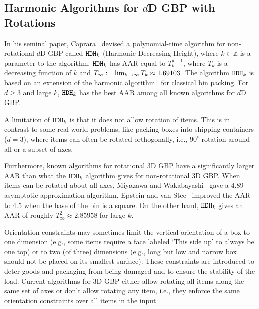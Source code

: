 \subsection{Harmonic Algorithms for \texorpdfstring{$d$}{d}D GBP with Rotations}

In his seminal paper, Caprara~\cite{caprara2008} devised a polynomial-time algorithm
for non-rotational $d$D GBP called $\operatorname{\mathtt{HDH}}_{k}$ (Harmonic Decreasing Height),
where $k \in \mathbb{Z}$ is a parameter to the algorithm.
$\operatorname{\mathtt{HDH}}_{k}$ has AAR equal to $T_k^{d-1}$,
where $T_k$ is a decreasing function of $k$ and
$T_{\infty} := \lim_{k \to \infty} T_k \approx 1.69103$.
The algorithm $\operatorname{\mathtt{HDH}}_{k}$ is based on an extension of the harmonic algorithm~\cite{leelee}
for classical bin packing.
For $d \ge 3$ and large $k$, $\operatorname{\mathtt{HDH}}_{k}$ has the best AAR
among all known algorithms for $d$D GBP.

A limitation of $\operatorname{\mathtt{HDH}}_{k}$ is that it does not allow rotation of items.
This is in contrast to some real-world problems,
like packing boxes into shipping containers ($d=3$),
where items can often be rotated orthogonally,
i.e., $90^{\circ}$ rotation around all or a subset of axes.

Furthermore, known algorithms for rotational 3D GBP have a significantly larger AAR
than what the $\operatorname{\mathtt{HDH}}_{k}$ algorithm gives for non-rotational 3D GBP.
When items can be rotated about all axes,
Miyazawa and Wakabayashi~\cite{miyazawa2009three} gave a
4.89-asymptotic-approximation algorithm.
Epstein and van Stee~\cite{epstein2006side} improved the AAR to
4.5 when the base of the bin is a square.
On the other hand, $\operatorname{\mathtt{HDH}}_{k}$ gives an AAR of roughly
$T_{\infty}^2 \approx 2.85958$ for large $k$.

Orientation constraints may sometimes limit the vertical orientation of a box to one dimension
(e.g., some items require a face labeled `This side up' to always be one top)
or to two (of three) dimensions
(e.g., long but low and narrow box should not be placed on its smallest surface).
These constraints are introduced to deter goods
and packaging from being damaged and to ensure the stability of the load.
Current algorithms for 3D GBP either allow rotating all items along the same set of axes
or don't allow rotating any item, i.e., they enforce the same
orientation constraints over all items in the input.

\begin{comment}
The state-of-the-art algorithms for 2D GBP allow rotating items,
but they assume that the bin is square, which is often not true in practice.
For $d > 3$, there are no known approximation algorithms for $d$D GBP
when items can be rotated.
\end{comment}

